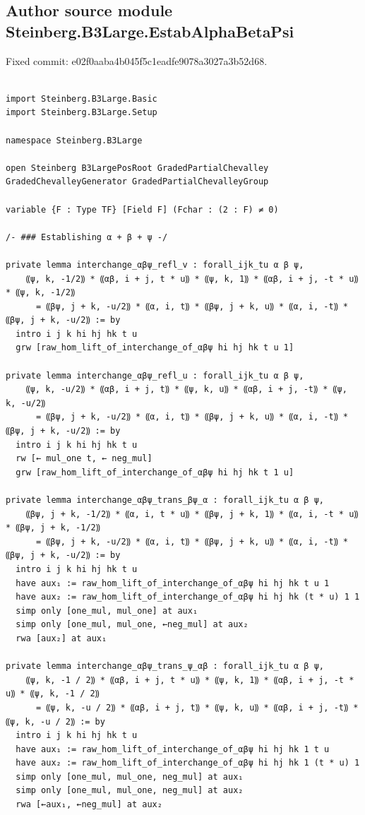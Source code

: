 \documentclass[10pt,a4paper]{article}
\begin{document}
\subsection*{Author source module Steinberg.B3Large.EstabAlphaBetaPsi}
\noindent Fixed commit: e02f0aaba4b045f5c1eadfe9078a3027a3b52d68.
\begin{Verbatim}

import Steinberg.B3Large.Basic
import Steinberg.B3Large.Setup

namespace Steinberg.B3Large

open Steinberg B3LargePosRoot GradedPartialChevalley GradedChevalleyGenerator GradedPartialChevalleyGroup

variable {F : Type TF} [Field F] (Fchar : (2 : F) ≠ 0)

/- ### Establishing α + β + ψ -/

private lemma interchange_αβψ_refl_v : forall_ijk_tu α β ψ,
    ⸨ψ, k, -1/2⸩ * ⸨αβ, i + j, t * u⸩ * ⸨ψ, k, 1⸩ * ⸨αβ, i + j, -t * u⸩ * ⸨ψ, k, -1/2⸩
      = ⸨βψ, j + k, -u/2⸩ * ⸨α, i, t⸩ * ⸨βψ, j + k, u⸩ * ⸨α, i, -t⸩ * ⸨βψ, j + k, -u/2⸩ := by
  intro i j k hi hj hk t u
  grw [raw_hom_lift_of_interchange_of_αβψ hi hj hk t u 1]

private lemma interchange_αβψ_refl_u : forall_ijk_tu α β ψ,
    ⸨ψ, k, -u/2⸩ * ⸨αβ, i + j, t⸩ * ⸨ψ, k, u⸩ * ⸨αβ, i + j, -t⸩ * ⸨ψ, k, -u/2⸩
      = ⸨βψ, j + k, -u/2⸩ * ⸨α, i, t⸩ * ⸨βψ, j + k, u⸩ * ⸨α, i, -t⸩ * ⸨βψ, j + k, -u/2⸩ := by
  intro i j k hi hj hk t u
  rw [← mul_one t, ← neg_mul]
  grw [raw_hom_lift_of_interchange_of_αβψ hi hj hk t 1 u]

private lemma interchange_αβψ_trans_βψ_α : forall_ijk_tu α β ψ,
    ⸨βψ, j + k, -1/2⸩ * ⸨α, i, t * u⸩ * ⸨βψ, j + k, 1⸩ * ⸨α, i, -t * u⸩ * ⸨βψ, j + k, -1/2⸩
      = ⸨βψ, j + k, -u/2⸩ * ⸨α, i, t⸩ * ⸨βψ, j + k, u⸩ * ⸨α, i, -t⸩ * ⸨βψ, j + k, -u/2⸩ := by
  intro i j k hi hj hk t u
  have aux₁ := raw_hom_lift_of_interchange_of_αβψ hi hj hk t u 1
  have aux₂ := raw_hom_lift_of_interchange_of_αβψ hi hj hk (t * u) 1 1
  simp only [one_mul, mul_one] at aux₁
  simp only [one_mul, mul_one, ←neg_mul] at aux₂
  rwa [aux₂] at aux₁

private lemma interchange_αβψ_trans_ψ_αβ : forall_ijk_tu α β ψ,
    ⸨ψ, k, -1 / 2⸩ * ⸨αβ, i + j, t * u⸩ * ⸨ψ, k, 1⸩ * ⸨αβ, i + j, -t * u⸩ * ⸨ψ, k, -1 / 2⸩
      = ⸨ψ, k, -u / 2⸩ * ⸨αβ, i + j, t⸩ * ⸨ψ, k, u⸩ * ⸨αβ, i + j, -t⸩ * ⸨ψ, k, -u / 2⸩ := by
  intro i j k hi hj hk t u
  have aux₁ := raw_hom_lift_of_interchange_of_αβψ hi hj hk 1 t u
  have aux₂ := raw_hom_lift_of_interchange_of_αβψ hi hj hk 1 (t * u) 1
  simp only [one_mul, mul_one, neg_mul] at aux₁
  simp only [one_mul, mul_one, neg_mul] at aux₂
  rwa [←aux₁, ←neg_mul] at aux₂


\end{Verbatim}
\end{document}
